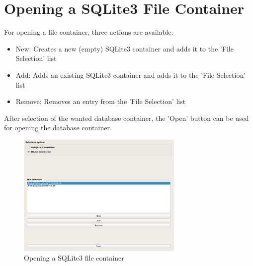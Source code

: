 \section{Opening a SQLite3 File Container}
\label{sec:sqlite_open}
For opening a file container, three actions are available:

\begin{itemize}  
\item New: Creates a new (empty) SQLite3 container and adds it to the 'File Selection' list
\item Add: Adds an existing  SQLite3 container and adds it to the 'File Selection' list
\item Remove: Removes an entry from the 'File Selection' list
\end{itemize}

After selection of the wanted database container, the 'Open' button can be used for opening the database container.

\begin{figure}[H]
  \center
    \includegraphics[width=8cm,frame]{../screenshots/sqlite3_open.png}
  \caption{Opening a SQLite3 file container}
  \label{fig:sqlite3_open}
\end{figure} 
